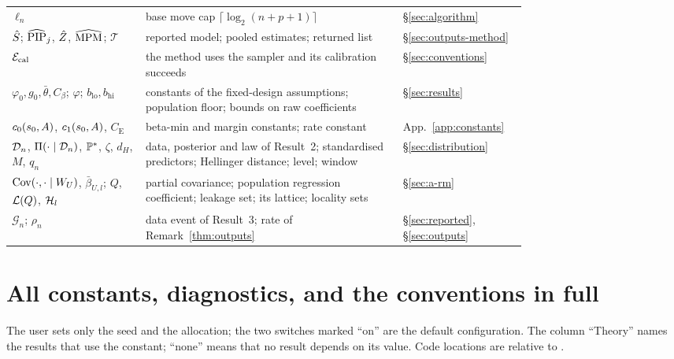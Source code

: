 {\begin{longtable}{@{}p{0.26\linewidth}p{0.5\linewidth}l@{}}
$\ell_n$ & base move cap $\lceil\log_2(n+p+1)\rceil$ & \S\ref{sec:algorithm} \\
$\Shat$; $\PIPhat_j$, $\Zhat$, $\MPMhat$; $\mathcal T$ & reported model; pooled estimates; returned list & \S\ref{sec:outputs-method} \\
$\Acal$ & the method uses the sampler and its calibration succeeds & \S\ref{sec:conventions} \\
$\varphi_0,g_0,\bar\theta,C_\beta$; $\varphi$; $b_{\mathrm{lo}},b_{\mathrm{hi}}$ & constants of the fixed-design assumptions; population floor; bounds on raw coefficients & \S\ref{sec:results} \\
$c_0(\sz,A)$, $c_1(\sz,A)$, $C_{\mathrm E}$ & beta-min and margin constants; rate constant & App.~\ref{app:constants} \\
$\Dn$, $\Pi(\cdot\mid\Dn)$, $\P^*$, $\zeta$, $d_H$, $M$, $q_n$ & data, posterior and law of Result~2; standardised predictors; Hellinger distance; level; window & \S\ref{sec:distribution} \\
$\Cov(\cdot,\cdot\mid W_U)$, $\bar\beta_{U,l}$; $Q$, $\Lat(Q)$, $\Hl_l$ & partial covariance; population regression coefficient; leakage set; its lattice; locality sets & \S\ref{sec:a-rm} \\
$\mathcal G_n$; $\rho_n$ & data event of Result~3; rate of Remark~\ref{thm:outputs} & \S\ref{sec:reported}, \S\ref{sec:outputs} \\
\bottomrule
\end{longtable}}

\section{All constants, diagnostics, and the conventions in full}\label{app:params}

The user sets only the seed and the allocation; the two switches marked ``on'' are the default configuration. The column
``Theory'' names the results that use the constant; ``none'' means that no result depends on its value. Code locations are
relative to .

